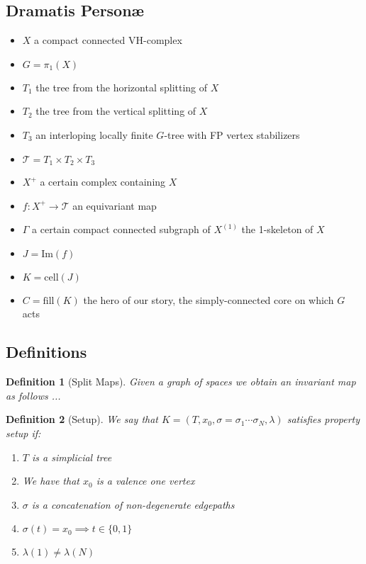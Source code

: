 \documentclass{article}
\theoremstyle{mystyle}
\newtheorem{defn}{Definition}
\theoremstyle{remark}
\begin{document}
\subsection{Dramatis Person\ae}
\begin{itemize}
    \item \(X\) a compact connected VH-complex
    \item \(G = \pi_{1} (X)\) 
    \item \(T_{1}\) the tree from the horizontal splitting of \(X\)
    \item \(T_{2}\) the tree from the vertical splitting of \(X\) 
    \item \(T_{3}\) an interloping locally finite \(G\)-tree with FP vertex stabilizers
    \item \(\mathscr{T} = T_{1} \times T_{2} \times T_{3} \) 
    \item \(X^{+}\) a certain complex containing \(X\)
    \item \(f: X^{+} \to \mathscr{T}\) an equivariant map
    \item \(\Gamma \) a certain compact connected subgraph of \(X^{(1)}\) the 1-skeleton of \(X\)
    \item \(J = \text{Im}(f)\) 
    \item \(K = \text{cell}(J)\) 
    \item \(C = \text{fill}(K)\) the hero of our story, the simply-connected core on which \(G\) acts
\end{itemize}

\subsection{Definitions}

\begin{defn}
    [Split Maps]
    \label{def:splitmaps} 
    Given a graph of spaces we obtain an invariant map as follows ...
\end{defn}

\begin{defn}
    [Setup]
    \label{def:setup} 
    We say that \(K = (T, x_{0},\sigma=\sigma_{1}\cdots\sigma_{N},\lambda)\) satisfies property {\em setup} if:
    \begin{enumerate}
        \item \(T\) is a simplicial tree
        \item We have that \(x_{0}\) is a valence one vertex
        \item \(\sigma\) is a concatenation of non-degenerate edgepaths
        \item \(\sigma (t)=x_{0} \implies t \in \{0,1\}\) 
        \item \(\lambda (1) \neq \lambda (N)\) 
    \end{enumerate}
\end{defn}
\end{document}
